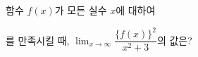 함수 $f(x)$가 모든 실수 $x$에 대하여\par\smallskip{}\par\smallskip\noindent 를 만족시킬 때, $\displaystyle\lim_{x\to\infty}\dfrac{\{f(x)\}^2}{x^2+3}$의 값은?

